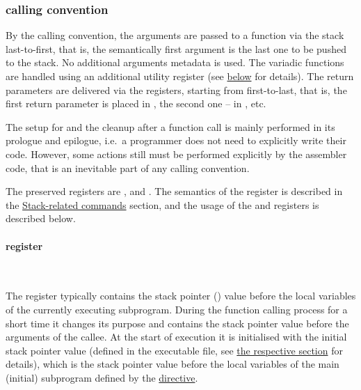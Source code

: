 \hypertarget{functions:convention}{
    \subsubsection{ calling convention}
}

\vspace{-0.2cm}

\hypertarget{karma:call:basic}{}
By the  calling convention, the arguments are passed to
a function via the stack last-to-first, that is, the semantically first argument
is the last one to be pushed to the stack.
No additional arguments metadata is used.
The variadic functions are handled using an additional utility register
 (see \hyperlink{r13}{below} for details).
The return parameters are delivered via the registers, starting from 
first-to-last, that is, the first return parameter is placed in ,
the second one -- in , etc.

The setup for and the cleanup after a function call is mainly performed
in its prologue and epilogue, i.e.\ a programmer does not need to explicitly
write their code.
However, some actions still must be performed explicitly
by the assembler code, that is an inevitable part of any calling convention.

The preserved registers are ,  and .
The semantics of the  register is described in
the \hyperlink{cmd:stack}{Stack-related commands} section, and the usage
of the  and  registers is described below.

\vspace{-0.5cm}

\hypertarget{r13}{
    \paragraph{ register}\
}

The  register typically contains the stack pointer () value
before the local variables of the currently executing subprogram.
During the function calling process for a short time it changes its purpose
and contains the stack pointer value before the arguments of
the callee.
At the start of execution it is initialised with the initial stack pointer
value (defined in the executable file, see
\hyperlink{executable}{the respective section} for details),
which is the stack pointer value before the local variables of the main
(initial) subprogram defined by
the \hyperlink{directives:end}{ directive}.

